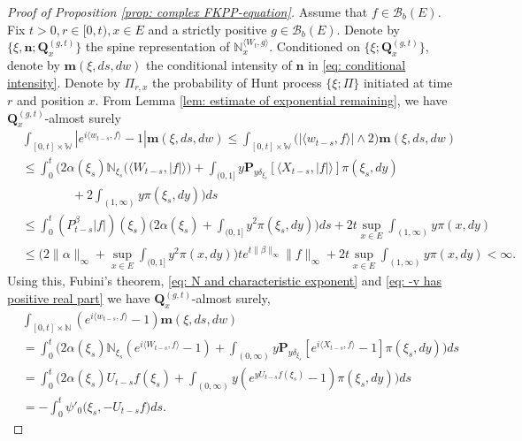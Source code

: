 \begin{proof}[Proof of Proposition \ref{prop: complex FKPP-equation}]
    Assume that $f\in \mathcal B_b(E)$.
    Fix $t>0, r\in [0,t), x\in E$ and a strictly positive $g\in \mathcal B_b(E)$.
    Denote by $\{\xi, \mathbf n; \mathbf Q_x^{(g,t)}\}$ the spine representation of $\mathbb N_x^{\langle W_t, g\rangle}$.
    Conditioned on $\{\xi; \mathbf Q_x^{(g,t)}\}$, denote by $\mathbf m(\xi, ds,dw)$ the conditional intensity of $\mathbf n$ in \eqref{eq: conditional intensity}.
    Denote by $\Pi_{r,x}$ the probability of Hunt process $\{\xi; \Pi\}$ initiated at time $r$ and position $x$.
    From Lemma \ref{lem: estimate of exponential remaining}, we have $\mathbf Q^{(g,t)}_{x}$-almost surely
\begin{align}
    &\int_{[0,t]\times \mathbb W}|e^{i \langle w_{t-s}, f\rangle} - 1| \mathbf m(\xi, ds,dw)
    \leq \int_{[0,t]\times \mathbb W}\big(| \langle w_{t-s}, f\rangle| \wedge 2\big) \mathbf m(\xi, ds,dw)
    \\&\leq \int_0^t \Big(2\alpha(\xi_s)\mathbb N_{\xi_s}\big( \langle W_{t-s}, |f|\rangle\big)  + \int_{(0,1]} y \mathbf P_{y \delta_{\xi_s}}[\langle X_{t-s}, |f|\rangle] \pi(\xi_s,dy)
    \\&\qquad\qquad+ 2\int_{(1,\infty)}y\pi(\xi_s,dy)\Big) ds
     \\&\leq \int_0^t (P_{t-s}^{\beta} |f|)(\xi_s)\Big(2\alpha(\xi_s)  + \int_{(0,1]} y^2 \pi(\xi_s,dy)\Big) ds + 2t \sup_{x\in E}\int_{(1,\infty)}y\pi(x,dy)
    \\&\leq \Big(2\|\alpha\|_\infty +\sup_{x\in E}\int_{(0,1]} y^2 \pi(x,dy)\Big) t e^{t\|\beta\|_\infty}\|f\|_\infty + 2t \sup_{x\in E}\int_{(1,\infty)}y\pi(x,dy)
    < \infty.
\end{align}
    Using this, Fubini's theorem, \eqref{eq: N and characteristic exponent} and \eqref{eq: -v has positive real part} we have $\mathbf Q^{(g,t)}_{x}$-almost surely,
\begin{align}
    &\int_{[0,t]\times \mathbb N}(e^{i \langle w_{t-s}, f\rangle} - 1) \mathbf m(\xi, ds,dw)
    \\&=\int_0^t \Big(2\alpha(\xi_s)\mathbb N_{\xi_s}(e^{i \langle W_{t-s}, f\rangle} - 1)  + \int_{(0,\infty)} y \mathbf P_{y \delta_{\xi_s}}[e^{i \langle X_{t-s}, f\rangle} - 1] \pi(\xi_s,dy)\Big) ds
    \\&=\int_0^t \Big( 2\alpha(\xi_s) U_{t-s} f(\xi_s) + \int_{(0,\infty)} y (e^{y U_{t-s}f(\xi_s)} - 1) \pi(\xi_s,dy) \Big) ds
    \\&= -\int_0^t \psi'_0 \big(\xi_s, -U_{t-s}f\big)ds.

\end{align}
\end{proof}
